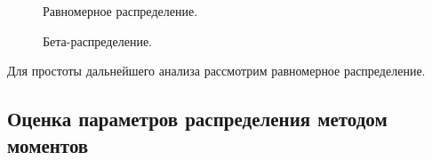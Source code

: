 \documentclass[14pt,a4paper]{scrartcl}
\begin{document}
\begin{figure}[t!]
	\caption{Равномерное распределение.}
	\label{ris:fit_unif}
\end{figure}

\begin{figure}[t!]
	\caption{Бета-распределение.}
	\label{ris:fit_beta}
\end{figure}




\newpage

Для простоты дальнейшего анализа рассмотрим равномерное распределение.
\subsection{Оценка параметров распределения методом моментов}
\end{document}
